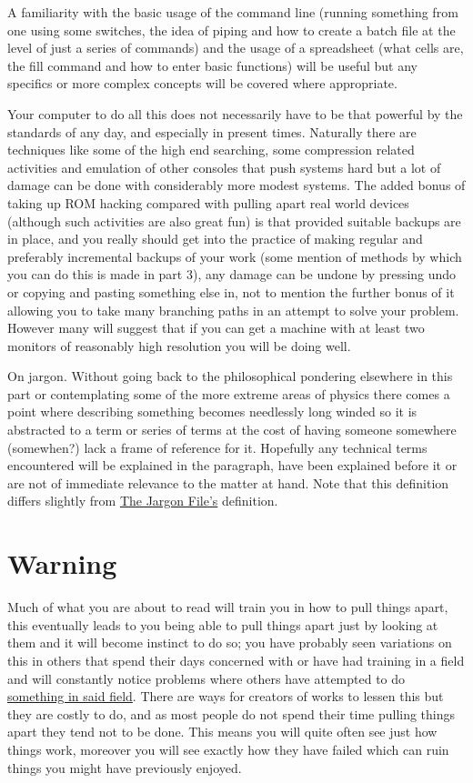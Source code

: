 \documentclass[
]{book}
\begin{document}
A familiarity with the basic usage of the command line (running something from one using some switches, the idea of piping and how to create a batch file at the level of just a series of commands) and the usage of a spreadsheet (what cells are, the fill command and how to enter basic functions) will be useful but any specifics or more complex concepts will be covered where appropriate.

Your computer to do all this does not necessarily have to be that powerful by the standards of any day, and especially in present times. Naturally there are techniques like some of the high end searching, some compression related activities and emulation of other consoles that push systems hard but a lot of damage can be done with considerably more modest systems. The added bonus of taking up ROM hacking compared with pulling apart real world devices (although such activities are also great fun) is that provided suitable backups are in place, and you really should get into the practice of making regular and preferably incremental backups of your work (some mention of methods by which you can do this is made in part 3), any damage can be undone by pressing undo or copying and pasting something else in, not to mention the further bonus of it allowing you to take many branching paths in an attempt to solve your problem. However many will suggest that if you can get a machine with at least two monitors of reasonably high resolution you will be doing well.

On jargon. Without going back to the philosophical pondering elsewhere in this part or contemplating some of the more extreme areas of physics there comes a point where describing something becomes needlessly long winded so it is abstracted to a term or series of terms at the cost of having someone somewhere (somewhen?) lack a frame of reference for it. Hopefully any technical terms encountered will be explained in the paragraph, have been explained before it or are not of immediate relevance to the matter at hand. Note that this definition differs slightly from \href{http://www.catb.org/~esr/jargon/html/distinctions.html}{The Jargon File's} definition.

\hypertarget{warning}{%
\section{Warning}\label{warning}}

Much of what you are about to read will train you in how to pull things apart, this eventually leads to you being able to pull things apart just by looking at them and it will become instinct to do so; you have probably seen variations on this in others that spend their days concerned with or have had training in a field and will constantly notice problems where others have attempted to do \href{http://xkcd.com/1015/}{something in said field}. There are ways for creators of works to lessen this but they are costly to do, and as most people do not spend their time pulling things apart they tend not to be done. This means you will quite often see just how things work, moreover you will see exactly how they have failed which can ruin things you might have previously enjoyed.
\end{document}
